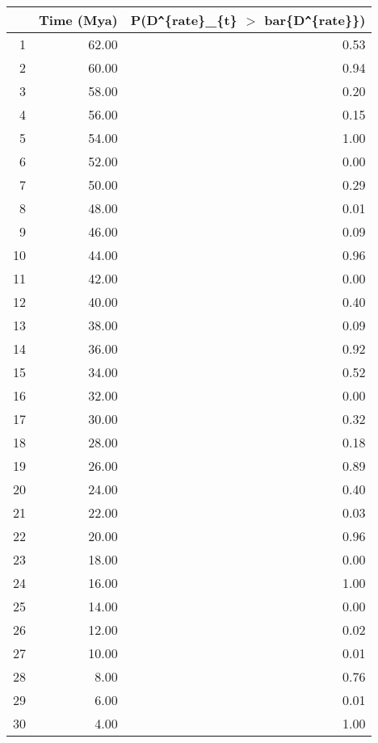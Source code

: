 \begin{table}[ht]
\centering
\begin{tabular}{rrr}
  \hline
 & Time (Mya) & P(D\verb|^|\{rate\}\_\{t\} $>$ bar\{D\verb|^|\{rate\}\}) \\ 
  \hline
1 & 62.00 & 0.53 \\ 
  2 & 60.00 & 0.94 \\ 
  3 & 58.00 & 0.20 \\ 
  4 & 56.00 & 0.15 \\ 
  5 & 54.00 & 1.00 \\ 
  6 & 52.00 & 0.00 \\ 
  7 & 50.00 & 0.29 \\ 
  8 & 48.00 & 0.01 \\ 
  9 & 46.00 & 0.09 \\ 
  10 & 44.00 & 0.96 \\ 
  11 & 42.00 & 0.00 \\ 
  12 & 40.00 & 0.40 \\ 
  13 & 38.00 & 0.09 \\ 
  14 & 36.00 & 0.92 \\ 
  15 & 34.00 & 0.52 \\ 
  16 & 32.00 & 0.00 \\ 
  17 & 30.00 & 0.32 \\ 
  18 & 28.00 & 0.18 \\ 
  19 & 26.00 & 0.89 \\ 
  20 & 24.00 & 0.40 \\ 
  21 & 22.00 & 0.03 \\ 
  22 & 20.00 & 0.96 \\ 
  23 & 18.00 & 0.00 \\ 
  24 & 16.00 & 1.00 \\ 
  25 & 14.00 & 0.00 \\ 
  26 & 12.00 & 0.02 \\ 
  27 & 10.00 & 0.01 \\ 
  28 & 8.00 & 0.76 \\ 
  29 & 6.00 & 0.01 \\ 
  30 & 4.00 & 1.00 \\ 
   \hline
\end{tabular}
\label{tab:rate_peak}
\end{table}
